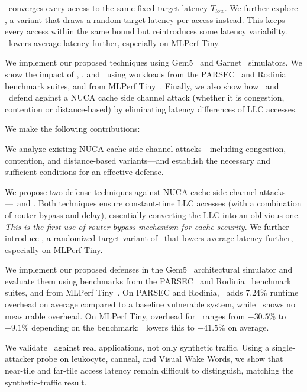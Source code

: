 \bscheme\ converges every access to the same fixed target latency $T_{low}$.
We further explore \rscheme, a variant that draws a random target latency per access instead.
This keeps every access within the same bound but reintroduces some latency variability.
\rscheme\ lowers average latency further, especially on MLPerf Tiny.

We implement our proposed techniques using Gem5~\cite{binkert2011gem5} and Garnet~\cite{agarwal2009garnet} simulators.
We show the impact of \jscheme, \bscheme, and \rscheme\ using workloads from the PARSEC~\cite{bienia2008parsec} and Rodinia~\cite{che2009rodinia} benchmark suites, and from MLPerf Tiny~\cite{banbury2021mlperf}.
Finally, we also show how \jscheme\ and \bscheme\ defend against a NUCA cache side channel attack (whether it is congestion, contention or distance-based) by eliminating latency differences of LLC accesses.

We make the following contributions:
\begin{compactitem}
    \item We analyze existing NUCA cache side channel attacks---including
    congestion, contention, and distance-based variants---and
    establish the necessary and sufficient conditions for an effective defense.

    \item We propose two defense techniques against NUCA cache side channel attacks---\jscheme\ and \bscheme.
    Both techniques ensure constant-time LLC accesses (with a combination of router bypass and delay), essentially converting the LLC into an oblivious one.
    {\em This is the first use of router bypass mechanism for cache security}.
    We further introduce \rscheme, a randomized-target variant of \bscheme\ that lowers average latency further, especially on MLPerf Tiny.

    \item We implement our proposed defenses in the Gem5~\cite{binkert2011gem5} architectural simulator and evaluate them using benchmarks from the PARSEC~\cite{bienia2008parsec} and Rodinia~\cite{che2009rodinia} benchmark suites, and from MLPerf Tiny~\cite{banbury2021mlperf}.
    On PARSEC and Rodinia, \jscheme\ adds $7.24\%$ runtime overhead on average compared to a baseline vulnerable system, while \bscheme\ shows no measurable overhead.
    On MLPerf Tiny, overhead for \bscheme\ ranges from $-30.5\%$ to $+9.1\%$ depending on the benchmark; \rscheme\ lowers this to $-41.5\%$ on average.

    \item We validate \bscheme\ against real applications, not only synthetic traffic.
    Using a single-attacker probe on leukocyte, canneal, and Visual Wake Words, we show that near-tile and far-tile access latency remain difficult to distinguish, matching the synthetic-traffic result.
\end{compactitem}

